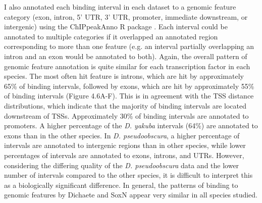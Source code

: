 I also annotated each binding interval in each dataset to a genomic feature category (exon, intron, 5’ UTR, 3’ UTR, promoter, immediate downstream, or intergenic) using the ChIPpeakAnno R package \citep{zhu_chippeakanno:_2010}. Each interval could be annotated to multiple categories if it overlapped an annotated region corresponding to more than one feature (e.g. an interval partially overlapping an intron and an exon would be annotated to both). Again, the overall pattern of genomic feature annotation is quite similar for each transcription factor in each species. The most often hit feature is introns, which are hit by approximately 65\% of binding intervals, followed by exons, which are hit by approximately 55\% of binding intervals (Figure 4.6A-F). This is in agreement with the TSS distance distributions, which indicate that the majority of binding intervals are located downstream of TSSs. Approximately 30\% of binding intervals are annotated to promoters. A higher percentage of the \emph{D. yakuba} intervals (64\%) are annotated to exons than in the other species. In \emph{D. pseudoobscura}, a higher percentage of intervals are annotated to intergenic regions than in other species, while lower percentages of intervals are annotated to exons, introns, and UTRs. However, considering the differing quality of the \emph{D. pseudoobscura} data and the lower number of intervals compared to the other species, it is difficult to interpret this as a biologically significant difference. In general, the patterns of binding to genomic features by Dichaete and SoxN appear very similar in all species studied.

